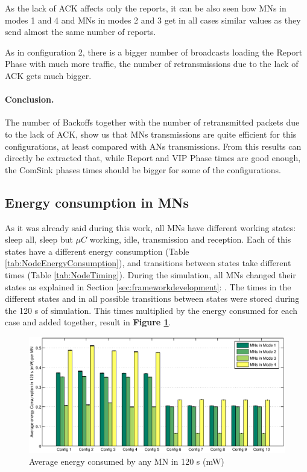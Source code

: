 As the lack of \ac{ACK} affects only the reports, it can be also seen how \acp{MN} in modes 1 and 4 and \acp{MN} in modes 2 and 3 get in all cases similar
values as they send almost the same number of reports.

As in configuration 2, there is a bigger number of broadcasts loading the Report Phase with much more traffic, the number of retransmissions due to 
the lack of \ac{ACK} gets much bigger.

\paragraph{Conclusion.} The number of Backoffs together with the number of retransmitted packets due to the lack of ACK, show us that \acp{MN} transmissions 
are quite efficient for this configurations, at least compared with \acp{AN} transmissions. From this results can directly be extracted that, while 
Report and VIP Phase times are good enough, the ComSink phases times should be bigger for some of the configurations.

\subsection{Energy consumption in \acp{MN}}

As it was already said during this work, all \acp{MN} have different working states: sleep all, sleep but $\mu C$ working, idle, transmission and 
reception. Each of this states have a different energy consumption (Table \ref{tab:NodeEnergyConsumption}), and transitions between states take 
different times (Table \ref{tab:NodeTiming}). During the simulation, all \acp{MN} changed their states as explained in Section 
\ref{sec:frameworkdevelopment}: . The times in the different states and in all possible transitions between states were stored
during the 120 s of simulation. This times multiplied by the energy consumed for each case and added together, result in \textbf{Figure \ref{fig:energyConsumptionPerMN}}.

\begin{figure}[ht]
 \begin{center}
  \includegraphics[width=1\textwidth]{energyConsumptionPerMN.eps}
 \end{center}
 \caption{Average energy consumed by any \ac{MN} in 120 s (mW)}
 \label{fig:energyConsumptionPerMN}
\end{figure}

